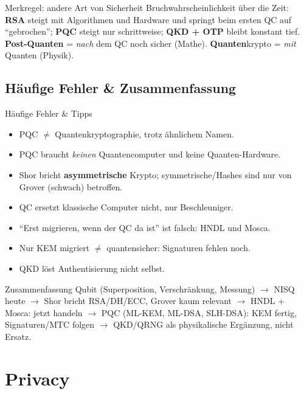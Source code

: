 \documentclass[a4paper, fontsize=7pt]{scrartcl}
\begin{document}
\begin{subbox}{Merkregel: andere Art von Sicherheit}
Bruchwahrscheinlichkeit über die Zeit: \textbf{RSA} steigt mit Algorithmen und
Hardware und springt beim ersten QC auf ``gebrochen''; \textbf{PQC} steigt nur
schrittweise; \textbf{QKD + OTP} bleibt konstant tief.\\
\textbf{Post-Quanten} = \emph{nach} dem QC noch sicher (Mathe).
\textbf{Quanten}krypto = \emph{mit} Quanten (Physik).
\end{subbox}

\subsection{Häufige Fehler \& Zusammenfassung}

\begin{subbox}{Häufige Fehler \& Tipps}
\begin{itemize}
    \item PQC $\neq$ Quantenkryptographie, trotz ähnlichem Namen.
    \item PQC braucht \emph{keinen} Quantencomputer und keine Quanten-Hardware.
    \item Shor bricht \textbf{asymmetrische} Krypto; symmetrische/Hashes sind nur
          von Grover (schwach) betroffen.
    \item QC ersetzt klassische Computer nicht, nur Beschleuniger.
    \item ``Erst migrieren, wenn der QC da ist'' ist falsch: HNDL und Mosca.
    \item Nur KEM migriert $\neq$ quantensicher: Signaturen fehlen noch.
    \item QKD löst Authentisierung nicht selbst.
\end{itemize}
\end{subbox}

\begin{subbox}{Zusammenfassung}
Qubit (Superposition, Verschränkung, Messung) $\to$ NISQ heute $\to$ Shor bricht
RSA/DH/ECC, Grover kaum relevant $\to$ HNDL + Mosca: jetzt handeln $\to$ PQC
(ML-KEM, ML-DSA, SLH-DSA): KEM fertig, Signaturen/MTC folgen $\to$ QKD/QRNG als
physikalische Ergänzung, nicht Ersatz.
\end{subbox}

\section{Privacy}
\end{document}
